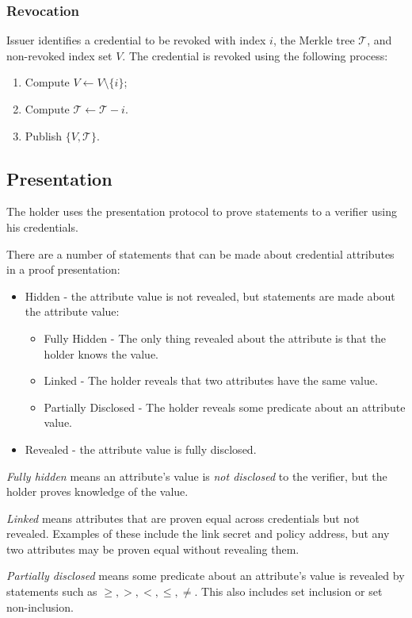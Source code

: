 \documentclass[a4paper]{article}
\begin{document}
\subsubsection{Revocation}
Issuer identifies a credential to be revoked with index $i$, the Merkle tree $\mathcal{T}$, and non-revoked index set $V$. The credential is revoked using the following process:
\begin{enumerate}
\item Compute $V\leftarrow V\setminus\{i\}$;
\item Compute $\mathcal{T} \leftarrow \mathcal{T} - i$.
\item Publish $\{V,\mathcal{T}\}$.
\end{enumerate}

\subsection{Presentation}
The holder uses the presentation protocol to prove statements to a verifier using his credentials.

There are a number of statements that can be made about credential attributes in a proof presentation:
\begin{itemize}
    \item Hidden - the attribute value is not revealed, but statements are made about the attribute value:
    \begin{itemize}
        \item Fully Hidden - The only thing revealed about the attribute is that the holder knows the value.
        \item Linked - The holder reveals that two attributes have the same value.
        \item Partially Disclosed - The holder reveals some predicate about an attribute value.
    \end{itemize}
    \item Revealed - the attribute value is fully disclosed.
\end{itemize}

\emph{Fully hidden} means an attribute's value is \emph{not disclosed} to the verifier, but the holder proves knowledge of the value.

\emph{Linked} means attributes that are proven equal across credentials but not revealed. Examples of these include the link secret and policy address, but any two attributes may be proven equal without revealing them.

\emph{Partially disclosed} means some predicate about an attribute's value is revealed by statements such as $\geq, >, <, \leq, \neq$. This also includes set inclusion or set non-inclusion.
\end{document}

